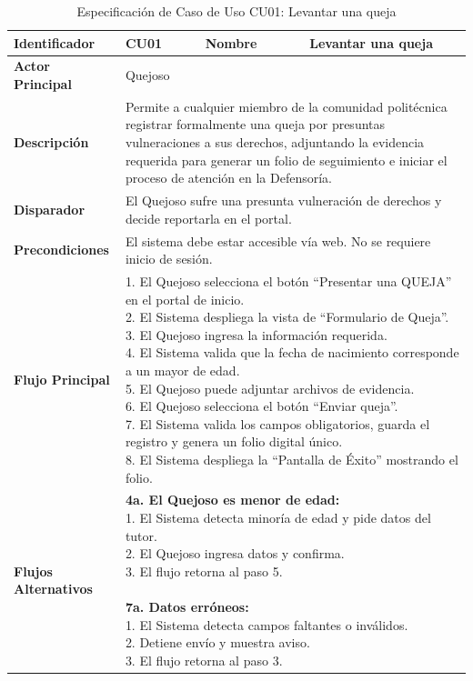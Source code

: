 \begingroup
\setlength{\parskip}{0pt}
\begin{longtable}{|p{3.5cm}|p{2cm}|p{2.5cm}|p{7cm}|}
\caption{Especificación de Caso de Uso CU01: Levantar una queja}
\label{tab:cu01_levantar_queja} \\
\hline
\textbf{Identificador} & CU01 & \textbf{Nombre} & Levantar una queja \\ \hline
\textbf{Actor Principal} & \multicolumn{3}{p{11.5cm}|}{Quejoso} \\ \hline
\textbf{Descripción} & \multicolumn{3}{p{11.5cm}|}{Permite a cualquier miembro de la comunidad politécnica registrar formalmente una queja por presuntas vulneraciones a sus derechos, adjuntando la evidencia requerida para generar un folio de seguimiento e iniciar el proceso de atención en la Defensoría.} \\ \hline
\textbf{Disparador} & \multicolumn{3}{p{11.5cm}|}{El Quejoso sufre una presunta vulneración de derechos y decide reportarla en el portal.} \\ \hline
\textbf{Precondiciones} & \multicolumn{3}{p{11.5cm}|}{El sistema debe estar accesible vía web. No se requiere inicio de sesión.} \\ \hline
\textbf{Flujo Principal} & \multicolumn{3}{p{11.5cm}|}{1. El Quejoso selecciona el botón ``Presentar una QUEJA'' en el portal de inicio.\newline 2. El Sistema despliega la vista de ``Formulario de Queja''.\newline 3. El Quejoso ingresa la información requerida.\newline 4. El Sistema valida que la fecha de nacimiento corresponde a un mayor de edad.\newline 5. El Quejoso puede adjuntar archivos de evidencia.\newline 6. El Quejoso selecciona el botón ``Enviar queja''.\newline 7. El Sistema valida los campos obligatorios, guarda el registro y genera un folio digital único.\newline 8. El Sistema despliega la ``Pantalla de Éxito'' mostrando el folio.} \\ \hline
\textbf{Flujos Alternativos} & \multicolumn{3}{p{11.5cm}|}{\textbf{4a. El Quejoso es menor de edad:}\newline 1. El Sistema detecta minoría de edad y pide datos del tutor.\newline 2. El Quejoso ingresa datos y confirma.\newline 3. El flujo retorna al paso 5.\newline\newline \textbf{7a. Datos erróneos:}\newline 1. El Sistema detecta campos faltantes o inválidos.\newline 2. Detiene envío y muestra aviso.\newline 3. El flujo retorna al paso 3.} \\ \hline

\end{longtable}
